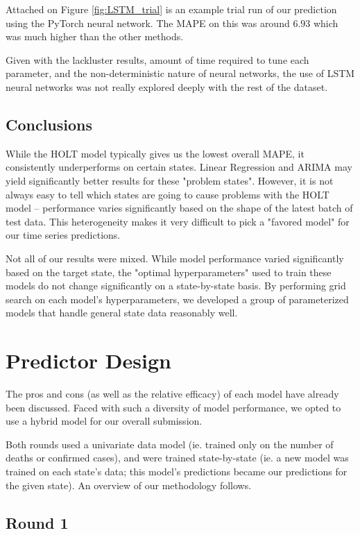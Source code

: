 \documentclass[sigconf,nonacm]{acmart}
\begin{document}
Attached on Figure  \ref{fig:LSTM_trial} is an example trial run of our prediction using the PyTorch neural network. The MAPE on this was around $6.93$ which was much higher than the other methods.

Given with the lackluster results, amount of time required to tune each parameter, and the non-deterministic nature of neural networks, the use of LSTM neural networks was not really explored deeply with the rest of the dataset.
\subsection{Conclusions}

While the HOLT model typically gives us the lowest overall MAPE, it
consistently underperforms on certain states. Linear Regression and ARIMA may
yield significantly better results for these "problem states". However, it is
not always easy to tell which states are going to cause problems with the HOLT
model -- performance varies significantly based on the shape of the latest
batch of test data. This heterogeneity makes it very difficult to pick a
"favored model" for our time series predictions. 

Not all of our results were mixed. While model performance varied significantly
based on the target state, the "optimal hyperparameters" used to train these
models do not change significantly on a state-by-state basis. By performing
grid search on each model's hyperparameters, we developed a group of
parameterized models that handle general state data reasonably well. 


\section{Predictor Design}

The pros and cons (as well as the relative efficacy) of each model have already
been discussed. Faced with such a diversity of model performance, we opted to
use a hybrid model for our overall submission. 

Both rounds used a univariate data model (ie. trained only on the number of
deaths or confirmed cases), and were trained state-by-state (ie. a new model
was trained on each state's data; this model's predictions became our
predictions for the given state). An overview of our methodology follows. 

\subsection{Round 1}
\end{document}
